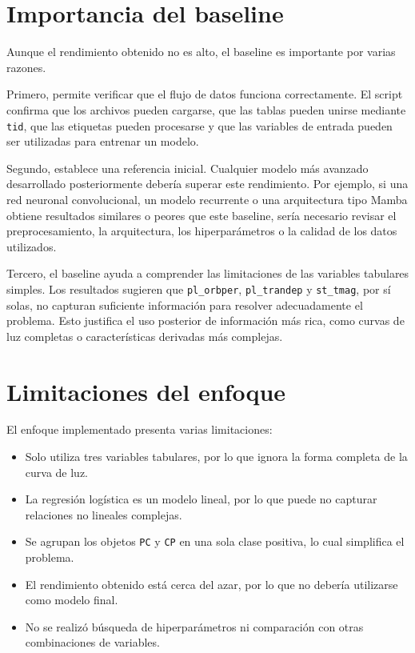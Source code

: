 \documentclass[12pt,letterpaper]{article}
\begin{document}
\section{Importancia del baseline}

Aunque el rendimiento obtenido no es alto, el baseline es importante por varias razones.

Primero, permite verificar que el flujo de datos funciona correctamente. El script confirma que los archivos pueden cargarse, que las tablas pueden unirse mediante \texttt{tid}, que las etiquetas pueden procesarse y que las variables de entrada pueden ser utilizadas para entrenar un modelo.

Segundo, establece una referencia inicial. Cualquier modelo más avanzado desarrollado posteriormente debería superar este rendimiento. Por ejemplo, si una red neuronal convolucional, un modelo recurrente o una arquitectura tipo Mamba obtiene resultados similares o peores que este baseline, sería necesario revisar el preprocesamiento, la arquitectura, los hiperparámetros o la calidad de los datos utilizados.

Tercero, el baseline ayuda a comprender las limitaciones de las variables tabulares simples. Los resultados sugieren que \texttt{pl\_orbper}, \texttt{pl\_trandep} y \texttt{st\_tmag}, por sí solas, no capturan suficiente información para resolver adecuadamente el problema. Esto justifica el uso posterior de información más rica, como curvas de luz completas o características derivadas más complejas.

\section{Limitaciones del enfoque}

El enfoque implementado presenta varias limitaciones:

\begin{itemize}
    \item Solo utiliza tres variables tabulares, por lo que ignora la forma completa de la curva de luz.
    \item La regresión logística es un modelo lineal, por lo que puede no capturar relaciones no lineales complejas.
    \item Se agrupan los objetos \texttt{PC} y \texttt{CP} en una sola clase positiva, lo cual simplifica el problema.
    \item El rendimiento obtenido está cerca del azar, por lo que no debería utilizarse como modelo final.
    \item No se realizó búsqueda de hiperparámetros ni comparación con otras combinaciones de variables.
\end{itemize}
\end{document}
